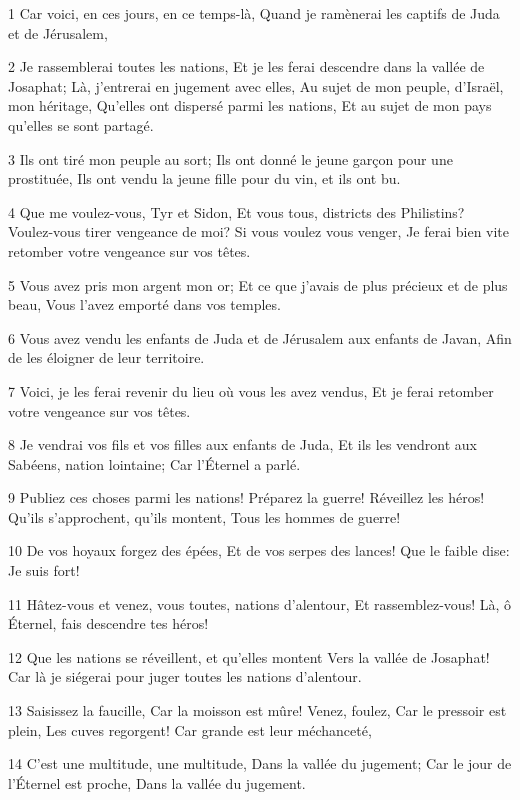 \par 1 Car voici, en ces jours, en ce temps-là, Quand je ramènerai les captifs de Juda et de Jérusalem,
\par 2 Je rassemblerai toutes les nations, Et je les ferai descendre dans la vallée de Josaphat; Là, j'entrerai en jugement avec elles, Au sujet de mon peuple, d'Israël, mon héritage, Qu'elles ont dispersé parmi les nations, Et au sujet de mon pays qu'elles se sont partagé.
\par 3 Ils ont tiré mon peuple au sort; Ils ont donné le jeune garçon pour une prostituée, Ils ont vendu la jeune fille pour du vin, et ils ont bu.
\par 4 Que me voulez-vous, Tyr et Sidon, Et vous tous, districts des Philistins? Voulez-vous tirer vengeance de moi? Si vous voulez vous venger, Je ferai bien vite retomber votre vengeance sur vos têtes.
\par 5 Vous avez pris mon argent mon or; Et ce que j'avais de plus précieux et de plus beau, Vous l'avez emporté dans vos temples.
\par 6 Vous avez vendu les enfants de Juda et de Jérusalem aux enfants de Javan, Afin de les éloigner de leur territoire.
\par 7 Voici, je les ferai revenir du lieu où vous les avez vendus, Et je ferai retomber votre vengeance sur vos têtes.
\par 8 Je vendrai vos fils et vos filles aux enfants de Juda, Et ils les vendront aux Sabéens, nation lointaine; Car l'Éternel a parlé.
\par 9 Publiez ces choses parmi les nations! Préparez la guerre! Réveillez les héros! Qu'ils s'approchent, qu'ils montent, Tous les hommes de guerre!
\par 10 De vos hoyaux forgez des épées, Et de vos serpes des lances! Que le faible dise: Je suis fort!
\par 11 Hâtez-vous et venez, vous toutes, nations d'alentour, Et rassemblez-vous! Là, ô Éternel, fais descendre tes héros!
\par 12 Que les nations se réveillent, et qu'elles montent Vers la vallée de Josaphat! Car là je siégerai pour juger toutes les nations d'alentour.
\par 13 Saisissez la faucille, Car la moisson est mûre! Venez, foulez, Car le pressoir est plein, Les cuves regorgent! Car grande est leur méchanceté,
\par 14 C'est une multitude, une multitude, Dans la vallée du jugement; Car le jour de l'Éternel est proche, Dans la vallée du jugement.
